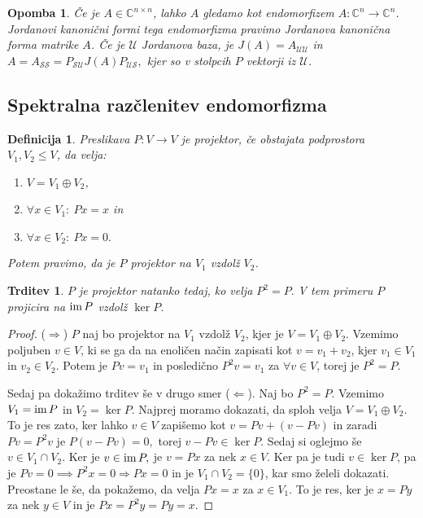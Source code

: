 \documentclass[10pt, a4paper]{article}
\newtheorem{trditev}[izr]{Trditev}
\newtheorem{defi}{Definicija}[section]
\newenvironment{noticeB}{%
  \tcolorbox[%
  notitle,
  empty,
  enhanced,  %
  breakable,
  coltext=black,
  colback=white, 
  fontupper=\rmfamily,
  parbox=false,
  noparskip,
  sharp corners,
  boxrule=-1pt,  %
  frame hidden,
  left=7pt,  %
  right=7pt,
  top=5pt,
  bottom=5pt,
  before skip=2.5ex plus 2pt,
  after skip=2.5ex plus 2pt,
  borderline west = {1.5pt}{-0.1pt}{blue!30!black}, %
  overlay unbroken and last={%
    \draw[color=black, line width=1.25pt]
    ($(frame.south west)+(1.pt, -0.1pt)$) -- ++(2em, 0);
  }
  ]}
{\endtcolorbox}
\newenvironment{definicija}{\begin{defi}\begin{noticeB}}{%
    \end{noticeB}\end{defi}}
\newtheorem*{opomba}{Opomba}
\newenvironment{noticeC}{%
  \tcolorbox[%
  notitle,
  empty,
  enhanced,  %
  breakable,
  coltext=black, 
  fontupper=\rmfamily,
  parbox=false,
  noparskip,
  sharp corners,
  boxrule=-1pt,  %
  frame hidden,
  left=7pt,  %
  right=7pt,
  top=5pt,
  bottom=5pt,
  before skip=2.5ex plus 2pt,
  after skip=2.5ex plus 2pt,
  overlay unbroken and last={%
  },
  ]}
{\endtcolorbox}
\newenvironment{dokaz}%
  {\begin{noticeC}\begin{proof}}%
  {\end{proof}\end{noticeC}}
\newcommand{\C}{\mathbb {C}}
\newcommand{\im}{\textup{\text{im}}\,}
\begin{document}
\begin{opomba}
    Če je $A \in \C^{n \times n}$, lahko $A$ gledamo kot endomorfizem $A : \C^n \rightarrow \C^n$.
    Jordanovi kanonični formi tega endomorfizma pravimo Jordanova kanonična forma matrike $A$.
    Če je $\mathcal{U}$ Jordanova baza, je $J(A) = A_\mathcal{UU}$ in
    $A = A_\mathcal{SS} = P_\mathcal{SU} J(A) P_\mathcal{US},$
    kjer so v stolpcih $P$ vektorji iz $\mathcal{U}$.
\end{opomba}

\subsection{Spektralna razčlenitev endomorfizma}

\begin{definicija}
    Preslikava $P: V \rightarrow V$ je projektor, če obstajata podprostora $V_1, V_2 \leq V$,
    da velja:
    \begin{enumerate}
        \item $V = V_1 \oplus V_2$,
        \item $\forall x \in V_1:\ Px = x$ in
        \item $\forall x \in V_2:\ Px = 0.$
    \end{enumerate}
    Potem pravimo, da je $P$ projektor na $V_1$ vzdolž $V_2$.
\end{definicija}

\begin{trditev}
    $P$ je projektor natanko tedaj, ko velja $P^2 = P.$
    V tem primeru $P$ projicira na $\im P$ vzdolž $\ker P$.
\end{trditev}

\begin{dokaz}
    ($\Rightarrow$) $P$ naj bo projektor na $V_1$ vzdolž $V_2$, kjer je $V = V_1 \oplus V_2$.
    Vzemimo poljuben $v \in V$, ki se ga da na enoličen način zapisati kot $v = v_1 + v_2$, kjer $v_1 \in V_1$ in $v_2 \in V_2$.
    Potem je $Pv = v_1$ in posledično $P^2 v = v_1$ za $\forall v \in V$, torej je $P^2 = P.$

    Sedaj pa dokažimo trditev še v drugo smer ($\Leftarrow$).
    Naj bo $P^2 = P.$ Vzemimo $V_1 = \im P$ in $V_2 = \ker P$.
    Najprej moramo dokazati, da sploh velja $V = V_1 \oplus V_2$.
    To je res zato, ker lahko $v \in V$ zapišemo kot $v = Pv + (v- Pv)$ in
    zaradi $Pv = P^2 v$ je $P(v - Pv) = 0,$ torej $v - Pv \in \ker P.$
    Sedaj si oglejmo še $v \in V_1 \cap V_2$.
    Ker je $v \in \im P,$ je $v = Px$ za nek $x \in V.$
    Ker pa je tudi $v \in \ker P$, pa je $Pv = 0 \implies P^2 x = 0 \Rightarrow Px = 0$ 
    in je $V_1 \cap V_2 = \{0\}$, kar smo želeli dokazati.
    Preostane le še, da pokažemo, da velja $Px = x$ za $x \in V_1$.
    To je res, ker je $x = Py$ za nek $y \in V$ in je 
        $Px = P^2 y = Py = x.$ 
\end{dokaz}
\end{document}
